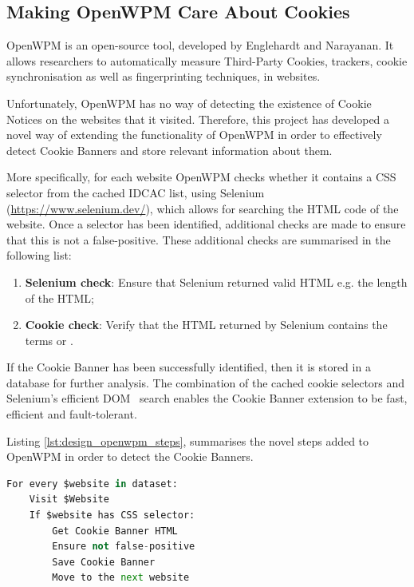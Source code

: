 \documentclass[../main.tex]{subfiles}
\begin{document}
\subsection{Making OpenWPM Care About Cookies}
OpenWPM is an open-source tool, developed by Englehardt and Narayanan. It allows researchers to automatically measure Third-Party Cookies, trackers, cookie synchronisation as well as fingerprinting techniques, in websites.

Unfortunately, OpenWPM has no way of detecting the existence of Cookie Notices on the websites that it visited. Therefore, this project has developed a novel way of extending the functionality of OpenWPM in order to effectively detect Cookie Banners and store relevant information about them. 

More specifically, for each website OpenWPM checks whether it contains a CSS selector from the cached IDCAC list, using Selenium (\url{https://www.selenium.dev/}), which allows for searching the HTML code of the website. Once a selector has been identified, additional checks are made to ensure that this is not a false-positive. These additional checks are summarised in the following list: 

\begin{enumerate}
    \item \textbf{Selenium check}: Ensure that Selenium returned valid HTML e.g. the length of the HTML;
    \item \textbf{Cookie check}: Verify that the HTML returned by Selenium contains the terms  or .
\end{enumerate}

If the Cookie Banner has been successfully identified, then it is stored in a database for further analysis. The combination of the cached cookie selectors and Selenium’s efficient DOM~\cite{wood1998document} search enables the Cookie Banner extension to be fast, efficient and fault-tolerant. 

Listing \ref{lst:design_openwpm_steps}, summarises the novel steps added to OpenWPM in order to detect the Cookie Banners.

\begin{lstlisting}[language=Python, caption=Pseudocode of the steps that the OpenWPM extension uses., label=lst:design_openwpm_steps,captionpos=b, style=lst_style]
For every $website in dataset:
    Visit $Website
    If $website has CSS selector:
        Get Cookie Banner HTML
        Ensure not false-positive
        Save Cookie Banner
        Move to the next website
\end{lstlisting}
\end{document}
